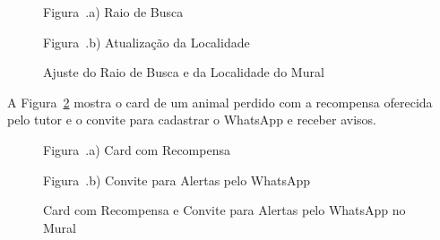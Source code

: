 \begin{figure}[H]
    \centering
    \caption{Ajuste do Raio de Busca e da Localidade do Mural}
    \label{fig:tela_raio_localidade}
    \vspace{0.15cm}
    \begin{minipage}[t]{0.48\textwidth}
        \centering
        \par\vspace{0.12cm}
        {\small Figura~\thefigure.a) Raio de Busca}
    \end{minipage}
    \hfill
    \begin{minipage}[t]{0.48\textwidth}
        \centering
        \par\vspace{0.12cm}
        {\small Figura~\thefigure.b) Atualização da Localidade}
    \end{minipage}
    \par\vspace{0.12cm}
\end{figure}

A Figura~\ref{fig:tela_mural_recompensa_whatsapp} mostra o card de um animal perdido com a recompensa oferecida pelo tutor e o convite para cadastrar o WhatsApp e receber avisos.

\begin{figure}[H]
    \centering
    \caption{Card com Recompensa e Convite para Alertas pelo WhatsApp no Mural}
    \label{fig:tela_mural_recompensa_whatsapp}
    \vspace{0.15cm}
    \begin{minipage}[t]{0.48\textwidth}
        \centering
        \par\vspace{0.12cm}
        {\small Figura~\thefigure.a) Card com Recompensa}
    \end{minipage}
    \hfill
    \begin{minipage}[t]{0.48\textwidth}
        \centering
        \par\vspace{0.12cm}
        {\small Figura~\thefigure.b) Convite para Alertas pelo WhatsApp}
    \end{minipage}
    \par\vspace{0.12cm}
\end{figure}


